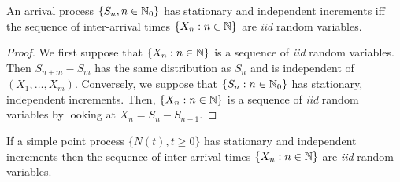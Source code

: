\documentclass[a4paper,10pt,english]{article}
\begin{document}
\begin{lem} 
An arrival process $\{S_n, n \in \mathbb{N}_0\}$ has stationary and independent increments iff 
the sequence of inter-arrival times $\{X_n: n \in \mathbb{N}\}$ are \emph{iid} random variables.
\end{lem}
\begin{proof} 
We first suppose that $\{X_n: n \in \mathbb{N}\}$ is a sequence of \emph{iid} random variables. 
Then $S_{n+m} - S_m$ has the same distribution as $S_n$ and is independent of $(X_1, \ldots, X_m)$. 
Conversely, we suppose that $\{S_n: n \in \mathbb{N}_0\}$ has stationary, independent increments. 
Then, $\{X_n: n \in \mathbb{N}\}$ is a sequence of \emph{iid} random variables by looking at $X_n = S_n - S_{n-1}$.   
\end{proof}

\begin{lem} If a simple point process $\{N(t), t \geqslant 0\}$ has stationary and independent increments then 
the sequence of inter-arrival times $\{X_n: n \in \mathbb{N}\}$ are \emph{iid} random variables.
\end{lem}
\end{document}
